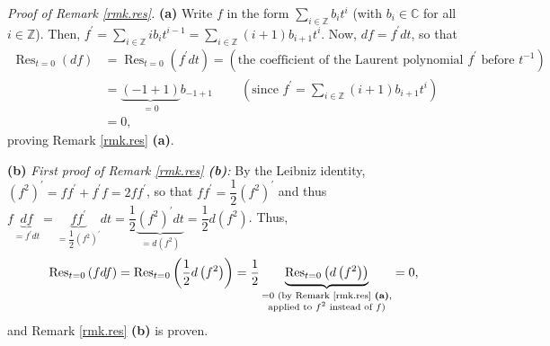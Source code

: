 \documentclass
[numbers=enddot,12pt,final,onecolumn,german,notitlepage]{scrartcl}%
\theoremstyle{definition}
\begin{document}
\textit{Proof of Remark \ref{rmk.res}.} \textbf{(a)} Write $f$ in the form
$\sum\limits_{i\in\mathbb{Z}}b_{i}t^{i}$ (with $b_{i}\in\mathbb{C}$ for all
$i\in\mathbb{Z}$). Then, $f^{\prime}=\sum\limits_{i\in\mathbb{Z}}ib_{i}%
t^{i-1}=\sum\limits_{i\in\mathbb{Z}}\left(  i+1\right)  b_{i+1}t^{i}$. Now,
$df=f^{\prime}dt$, so that
\begin{align*}
\operatorname*{Res}\nolimits_{t=0}\left(  df\right)   &  =\operatorname*{Res}%
\nolimits_{t=0}\left(  f^{\prime}dt\right)  =\left(  \text{the coefficient of
the Laurent polynomial }f^{\prime}\text{ before }t^{-1}\right) \\
&  =\underbrace{\left(  -1+1\right)  }_{=0}b_{-1+1}\ \ \ \ \ \ \ \ \ \ \left(
\text{since }f^{\prime}=\sum\limits_{i\in\mathbb{Z}}\left(  i+1\right)
b_{i+1}t^{i}\right) \\
&  =0,
\end{align*}
proving Remark \ref{rmk.res} \textbf{(a)}.

\textbf{(b)} \textit{First proof of Remark \ref{rmk.res} \textbf{(b)}:} By the
Leibniz identity, $\left(  f^{2}\right)  ^{\prime}=ff^{\prime}+f^{\prime
}f=2ff^{\prime}$, so that $ff^{\prime}=\dfrac{1}{2}\left(  f^{2}\right)
^{\prime}$ and thus $f\underbrace{df}_{=f^{\prime}dt}=\underbrace{ff^{\prime}%
}_{=\dfrac{1}{2}\left(  f^{2}\right)  ^{\prime}}dt=\dfrac{1}{2}%
\underbrace{\left(  f^{2}\right)  ^{\prime}dt}_{=d\left(  f^{2}\right)
}=\dfrac{1}{2}d\left(  f^{2}\right)  $. Thus,
\[
\operatorname*{Res}\nolimits_{t=0}\left(  fdf\right)  =\operatorname*{Res}%
\nolimits_{t=0}\left(  \dfrac{1}{2}d\left(  f^{2}\right)  \right)  =\dfrac
{1}{2}\underbrace{\operatorname*{Res}\nolimits_{t=0}\left(  d\left(
f^{2}\right)  \right)  }_{\substack{=0\text{ (by Remark \ref{rmk.res}
\textbf{(a)},}\\\text{applied to }f^{2}\text{ instead of }f\text{)}}}=0,
\]
and Remark \ref{rmk.res} \textbf{(b)} is proven.
\end{document}

